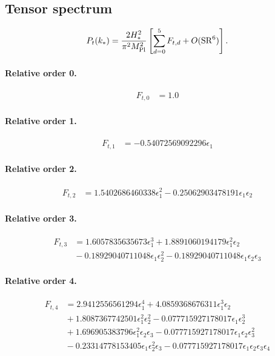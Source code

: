 \documentclass[10pt]{article}
\begin{document}
\subsection{Tensor spectrum}
\[P_t(k_*)=\frac{2H_*^2}{\pi^2M_{\rm Pl}^2}\left[\sum_{d=0}^{5}F_{t,d}+O(\mathrm{SR}^{6})\right].\]
\paragraph{Relative order 0.}
\begin{align*}
F_{t,0} &= 1.0
\end{align*}

\paragraph{Relative order 1.}
\begin{align*}
F_{t,1} &=  - 0.54072569092296 \epsilon_{1}
\end{align*}

\paragraph{Relative order 2.}
\begin{align*}
F_{t,2} &= 1.5402686460338 \epsilon_{1}^{2} - 0.25062903478191 \epsilon_{1} \epsilon_{2}
\end{align*}

\paragraph{Relative order 3.}
\begin{align*}
F_{t,3} &= 1.6057835635673 \epsilon_{1}^{3} + 1.8891060194179 \epsilon_{1}^{2} \epsilon_{2} \\
&{}  - 0.18929040711048 \epsilon_{1} \epsilon_{2}^{2} - 0.18929040711048 \epsilon_{1} \epsilon_{2} \epsilon_{3}
\end{align*}

\paragraph{Relative order 4.}
\begin{align*}
F_{t,4} &= 2.9412556561294 \epsilon_{1}^{4} + 4.0859368676311 \epsilon_{1}^{3} \epsilon_{2} \\
&{}  + 1.8087367742501 \epsilon_{1}^{2} \epsilon_{2}^{2} - 0.077715927178017 \epsilon_{1} \epsilon_{2}^{3} \\
&{}  + 1.696905383796 \epsilon_{1}^{2} \epsilon_{2} \epsilon_{3} - 0.077715927178017 \epsilon_{1} \epsilon_{2} \epsilon_{3}^{2} \\
&{}  - 0.23314778153405 \epsilon_{1} \epsilon_{2}^{2} \epsilon_{3} - 0.077715927178017 \epsilon_{1} \epsilon_{2} \epsilon_{3} \epsilon_{4}
\end{align*}
\end{document}
